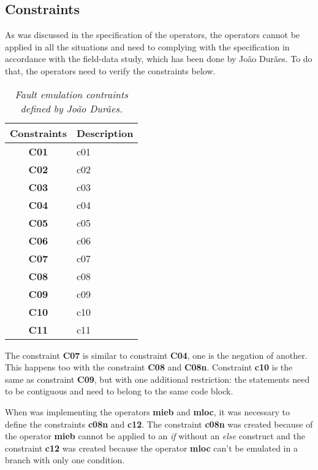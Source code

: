 \subsection{Constraints}

As was discussed in the specification of the operators, the operators cannot be applied in all the situations and need to complying with the specification in accordance with the field-data study, which has been done by João Durães. To do that, the operators need to verify the constraints below.

\begin{table}[!ht]
\centering
\begin{tabular}{|c|p{12cm}|}
\hline
\textbf{Constraints}            & \multicolumn{1}{c|}{\textbf{Description}}                                     \\ \hline \hline
\textbf{C01}         			& \Acl{c01} \\ \hline
\textbf{C02}         			& \Acl{c02} \\ \hline
\textbf{C03}         			& \Acl{c03} \\ \hline
\textbf{C04}         			& \Acl{c04} \\ \hline
\textbf{C05}         			& \Acl{c05} \\ \hline
\textbf{C06}         			& \Acl{c06} \\ \hline
\textbf{C07}         			& \Acl{c07} \\ \hline
\textbf{C08}         			& \Acl{c08} \\ \hline
\textbf{C09}         			& \Acl{c09} \\ \hline
\textbf{C10}         			& \Acl{c10} \\ \hline
\textbf{C11}         			& \Acl{c11} \\ \hline
\end{tabular}
\caption{\small \sl Fault emulation contraints defined by João Durães.\label{tab:faultEmulationConstraintsDuraes}}
\end{table}

The constraint \textbf{C07} is similar to constraint \textbf{C04}, one is the negation of another. This happens too with the constraint \textbf{C08} and \textbf{C08n}.
Constraint \textbf{c10} is the same as constraint \textbf{C09}, but with one additional restriction: the statements need to be contiguous and need to belong to the same code block.

When was implementing the operators \textbf{\ac{mieb}} and \textbf{\ac{mloc}}, it was necessary to define the constraints \textbf{\ac{c08n}} and \textbf{\ac{c12}}. The constraint \textbf{\ac{c08n}} was created because of the operator \textbf{\ac{mieb}} cannot be applied to an \textit{if} without an \textit{else} construct and the constraint \textbf{\ac{c12}} was created because the operator \textbf{\ac{mloc}} can't be emulated in a branch with only one condition.

